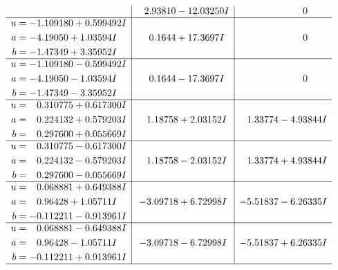 \documentclass[1p]{elsarticle_modified}
\theoremstyle{definition}
\begin{document}
$$\begin{array}{c|c|c}
 & \phantom{-}2.93810 - 12.03250 I & \phantom{-0.000000 } 0 \\ \hline\begin{aligned}
u &= -1.109180 + 0.599492 I \\
a &= -4.19050 + 1.03594 I \\
b &= -1.47349 + 3.35952 I\end{aligned}
 & \phantom{-}0.1644 + 17.3697 I & \phantom{-0.000000 } 0 \\ \hline\begin{aligned}
u &= -1.109180 - 0.599492 I \\
a &= -4.19050 - 1.03594 I \\
b &= -1.47349 - 3.35952 I\end{aligned}
 & \phantom{-}0.1644 - 17.3697 I & \phantom{-0.000000 } 0 \\ \hline\begin{aligned}
u &= \phantom{-}0.310775 + 0.617300 I \\
a &= \phantom{-}0.224132 + 0.579203 I \\
b &= \phantom{-}0.297600 + 0.055669 I\end{aligned}
 & \phantom{-}1.18758 + 2.03152 I & \phantom{-}1.33774 - 4.93844 I \\ \hline\begin{aligned}
u &= \phantom{-}0.310775 - 0.617300 I \\
a &= \phantom{-}0.224132 - 0.579203 I \\
b &= \phantom{-}0.297600 - 0.055669 I\end{aligned}
 & \phantom{-}1.18758 - 2.03152 I & \phantom{-}1.33774 + 4.93844 I \\ \hline\begin{aligned}
u &= \phantom{-}0.068881 + 0.649388 I \\
a &= \phantom{-}0.96428 + 1.05711 I \\
b &= -0.112211 - 0.913961 I\end{aligned}
 & -3.09718 + 6.72998 I & -5.51837 - 6.26335 I \\ \hline\begin{aligned}
u &= \phantom{-}0.068881 - 0.649388 I \\
a &= \phantom{-}0.96428 - 1.05711 I \\
b &= -0.112211 + 0.913961 I\end{aligned}
 & -3.09718 - 6.72998 I & -5.51837 + 6.26335 I\\
 \hline 
 \end{array}$$\newpage$$\begin{array}{c|c|c}  

\end{array}$$
\end{document}
